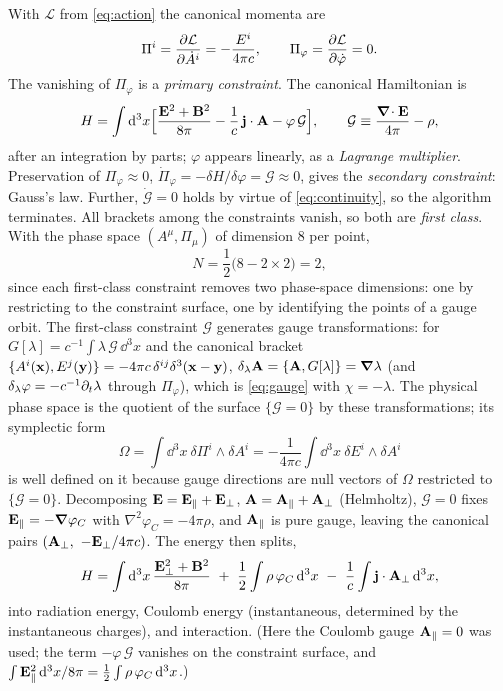 With $\mathcal L$ from \eqref{eq:action} the canonical momenta are
\begin{equation}
\Pi^i=\frac{\partial\mathcal L}{\partial\dot A^i}=-\frac{E^i}{4\pi c},\qquad
\Pi_\varphi=\frac{\partial\mathcal L}{\partial\dot\varphi}=0 .
\end{equation}
The vanishing of $\Pi_\varphi$ is a \emph{primary constraint}.  The
canonical Hamiltonian is
\begin{equation}\label{eq:H-can}
H=\int\mathrm{d}^3x\Big[\frac{\mathbf{E}^2+\mathbf{B}^2}{8\pi}-\frac1c\,\mathbf{j}\cdot\mathbf{A}-\varphi\,\mathcal G\Big],\qquad
\mathcal G\equiv\frac{\boldsymbol{\nabla}\!\cdot\mathbf{E}}{4\pi}-\rho ,
\end{equation}
after an integration by parts; $\varphi$ appears linearly, as a
\emph{Lagrange multiplier}.  Preservation of $\Pi_\varphi\approx0$,
$\dot\Pi_\varphi=-\delta H/\delta\varphi=\mathcal G\approx0$, gives the
\emph{secondary constraint}: Gauss's law.  Further, $\dot{\mathcal G}=0$
holds by virtue of \eqref{eq:continuity}, so the algorithm terminates.
All brackets among the constraints vanish, so both are
\emph{first class}.  With the phase space $(A^\mu,\Pi_\mu)$ of
dimension $8$ per point,
\begin{equation}
N=\frac12\big(8-2\times 2\big)=2 ,
\end{equation}
since each first-class constraint removes two phase-space dimensions:
one by restricting to the constraint surface, one by identifying the
points of a gauge orbit.  The first-class constraint $\mathcal G$ generates gauge
transformations: for
$G[\lambda]=c^{-1}\!\int\lambda\,\mathcal G\,\dd^3x$ and the canonical bracket
$\{A^i(\mathbf{x}),E^j(\mathbf{y})\}=-4\pi c\,\delta^{ij}\delta^3(\mathbf{x}-\mathbf{y})$,
$\delta_\lambda\mathbf{A}=\{\mathbf{A},G[\lambda]\}=\boldsymbol{\nabla}\lambda$ (and
$\delta_\lambda\varphi=-c^{-1}\partial_t\lambda$ through $\Pi_\varphi$),
which is \eqref{eq:gauge} with $\chi=-\lambda$.  The physical phase space is the
quotient of the surface $\{\mathcal G=0\}$ by these transformations; its
symplectic form
\begin{equation}
\Omega=\int\dd^3x\ \delta\Pi^i\wedge\delta A^i
=-\frac1{4\pi c}\int\dd^3x\ \delta E^i\wedge\delta A^i
\end{equation}
is well defined on it because gauge directions are null vectors of $\Omega$
restricted to $\{\mathcal G=0\}$.  Decomposing
$\mathbf{E}=\mathbf{E}_\parallel+\mathbf{E}_\perp$, $\mathbf{A}=\mathbf{A}_\parallel+\mathbf{A}_\perp$ (Helmholtz),
$\mathcal G=0$ fixes $\mathbf{E}_\parallel=-\boldsymbol{\nabla}\varphi_C$ with
$\nabla^2\varphi_C=-4\pi\rho$, and $\mathbf{A}_\parallel$ is pure gauge, leaving
the canonical pairs $(\vA_\perp,\ -\vE_\perp/4\pi c)$.  The energy then
splits,
\begin{equation}\label{eq:H-split}
H=\int\dd^3x\,\frac{\vE_\perp^2+\vB^2}{8\pi}\ +\ \frac12\int\rho\,\varphi_C\,\dd^3x\ -\ \frac1c\int\vj\cdot\vA_\perp\,\dd^3x ,
\end{equation}
into radiation energy, Coulomb energy (instantaneous, determined by
the instantaneous charges), and interaction.  (Here the Coulomb gauge $\mathbf{A}_\parallel=0$ was used; the term
$-\varphi\,\mathcal G$ vanishes on the constraint surface, and
$\int\mathbf{E}_\parallel^2\,\mathrm{d}^3x/8\pi=\tfrac12\int\rho\,\varphi_C\,\mathrm{d}^3x$.)

